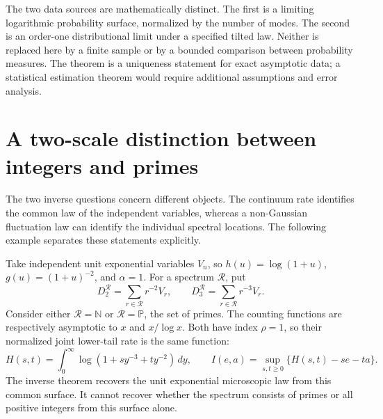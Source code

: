\documentclass[11pt,letterpaper]{article}
\theoremstyle{definition}
\theoremstyle{remark}
\newcommand{\1}{\mathbf 1}
\begin{document}
The two data sources are mathematically distinct. The first is a
limiting logarithmic probability surface, normalized by the number
of modes. The second is an order-one distributional limit under a
specified tilted law. Neither is replaced here by a finite sample or
by a bounded comparison between probability measures. The theorem is
a uniqueness statement for exact asymptotic data; a statistical
estimation theorem would require additional assumptions and error
analysis.


\section{A two-scale distinction between integers and primes}
\label{p05:sec:two-scale-example}

The two inverse questions concern different objects. The continuum rate
identifies the common law of the independent variables, whereas a
non-Gaussian fluctuation law can identify the individual spectral
locations. The following example separates these statements explicitly.

Take independent unit exponential variables $V_n$, so
$h(u)=\log(1+u)$, $g(u)=(1+u)^{-2}$, and $\alpha=1$.
For a spectrum $\mathcal R$, put
\[
 D_2^{\mathcal R}=\sum_{r\in\mathcal R}r^{-2}V_r,
 \qquad D_3^{\mathcal R}=\sum_{r\in\mathcal R}r^{-3}V_r.
\]
Consider either $\mathcal R=\mathbb N$ or $\mathcal R=\mathbb P$,
the set of primes. The counting functions are respectively asymptotic
to $x$ and $x/\log x$. Both have index $\rho=1$, so their normalized
joint lower-tail rate is the same function:
\[
 H(s,t)=\int_0^\infty\log(1+s y^{-3}+t y^{-2})\,dy,
 \qquad I(e,a)=\sup_{s,t\ge0}\{H(s,t)-se-ta\}.
\]
The inverse theorem recovers the unit exponential microscopic law from
this common surface. It cannot recover whether the spectrum consists
of primes or all positive integers from this surface alone.
\end{document}
